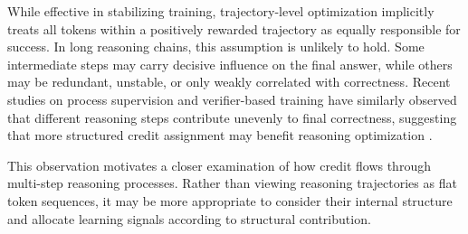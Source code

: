 \documentclass[12pt]{report}
\begin{document}
While effective in stabilizing training, trajectory-level optimization implicitly treats all tokens within a positively rewarded trajectory as equally responsible for success. 
In long reasoning chains, this assumption is unlikely to hold. 
Some intermediate steps may carry decisive influence on the final answer, while others may be redundant, unstable, or only weakly correlated with correctness. 
Recent studies on process supervision and verifier-based training have similarly observed that different reasoning steps contribute unevenly to final correctness, suggesting that more structured credit assignment may benefit reasoning optimization \cite{lightman2023letsverifystepstep,cobbe2021trainingverifierssolvemath, kazemnejad2025vinepporefiningcreditassignment}.

This observation motivates a closer examination of how credit flows through multi-step reasoning processes. 
Rather than viewing reasoning trajectories as flat token sequences, it may be more appropriate to consider their internal structure and allocate learning signals according to structural contribution.



\end{document}
